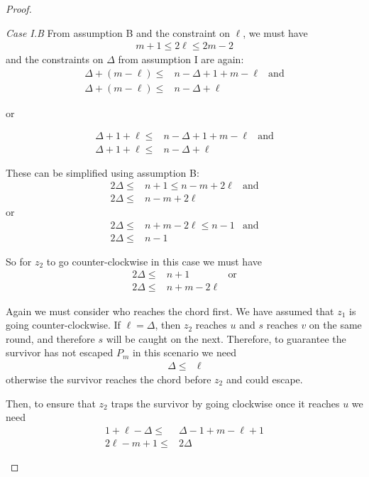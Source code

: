 \begin{proof}
\begin{description}
  \textit{Case I.B}
  From assumption B and the constraint on $\ell$, we must have
  \begin{align*}
   m + 1 \leq 2 \ell \leq 2m - 2
  \end{align*}
  and the constraints on $\Delta$ from assumption I are again:
  \begin{align*}
   \Delta + (m - \ell) \leq & n - \Delta + 1 + m - \ell & \text{and} \\
   \Delta + (m - \ell) \leq & n - \Delta + \ell
  \end{align*}
  \begin{center}or\end{center}
  \begin{align*}
   \Delta + 1 + \ell \leq & n - \Delta + 1 + m - \ell & \text{and} \\
   \Delta + 1 + \ell \leq & n - \Delta + \ell
  \end{align*}

  These can be simplified using assumption B:
  \begin{align*}
   2 \Delta \leq & n+1 \leq n-m+2\ell & \text{and} \\
   2 \Delta \leq & n - m + 2\ell
  \end{align*}
  or
  \begin{align*}
   2 \Delta \leq & n+m -2 \ell \leq n-1 & \text{and} \\
   2 \Delta \leq & n -1
  \end{align*}

  So for $z_2$ to go counter-clockwise in this case we must have
  \begin{align*}
   2 \Delta \leq & n + 1         & \text{or} \\
   2 \Delta \leq & n + m - 2\ell
  \end{align*}

  Again we must consider who reaches the chord first. We have assumed that $z_1$
  is going counter-clockwise. If $\ell = \Delta$, then $z_2$ reaches $u$ and $s$
  reaches $v$ on the same round, and therefore $s$ will be caught on the next.
  Therefore, to guarantee the survivor has not escaped $P_m$ in this scenario we need
  \begin{align*}
   \Delta \leq & \ell
  \end{align*}
  otherwise the survivor reaches the chord before $z_2$ and could escape.

  Then, to ensure that $z_2$ traps the survivor by going clockwise once
  it reaches $u$ we need
  \begin{align*}
   1 + \ell - \Delta \leq & \Delta -1 + m - \ell + 1 \\
   2\ell - m + 1 \leq     & 2 \Delta
  \end{align*}


\end{description}
\end{proof}
